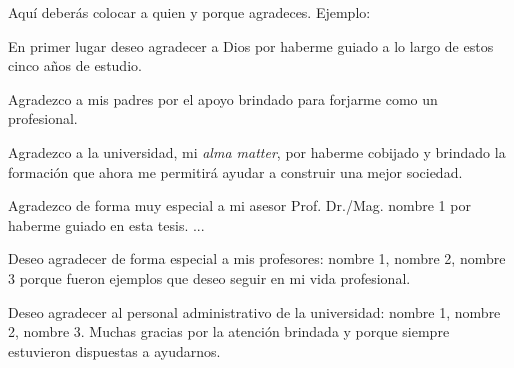 \begin{agradecimientos}
Aquí deberás colocar a quien y porque agradeces. Ejemplo:

En primer lugar deseo agradecer a Dios por haberme guiado a lo largo de estos cinco años de estudio.

Agradezco a mis padres por el apoyo brindado para forjarme como un profesional.

Agradezco a la universidad, mi \textit{alma matter}, por haberme cobijado y brindado la formación que ahora me permitirá ayudar a construir una mejor sociedad.

Agradezco de forma muy especial a mi asesor Prof. Dr./Mag. nombre 1 por haberme guiado en esta tesis. ...

Deseo agradecer de forma especial a mis profesores: nombre 1, nombre 2, nombre 3 porque fueron ejemplos que deseo seguir en mi vida profesional.

Deseo agradecer al personal administrativo de la universidad: nombre 1, nombre 2, nombre 3. Muchas gracias por la atención brindada y porque siempre estuvieron dispuestas a ayudarnos.
\end{agradecimientos}

